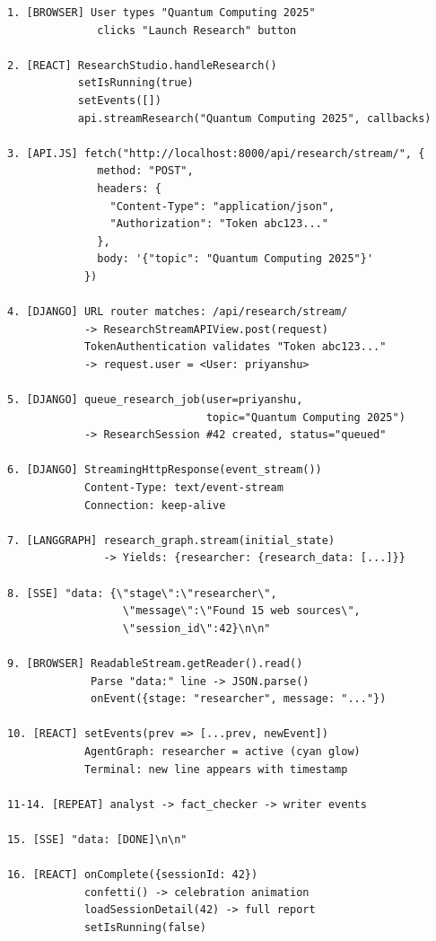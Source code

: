 \documentclass[11pt,a4paper,twoside]{report}
\begin{document}
\begin{lstlisting}[language={},caption={Complete Request Trace}]
1. [BROWSER] User types "Quantum Computing 2025"
              clicks "Launch Research" button

2. [REACT] ResearchStudio.handleResearch()
           setIsRunning(true)
           setEvents([])
           api.streamResearch("Quantum Computing 2025", callbacks)

3. [API.JS] fetch("http://localhost:8000/api/research/stream/", {
              method: "POST",
              headers: {
                "Content-Type": "application/json",
                "Authorization": "Token abc123..."
              },
              body: '{"topic": "Quantum Computing 2025"}'
            })

4. [DJANGO] URL router matches: /api/research/stream/
            -> ResearchStreamAPIView.post(request)
            TokenAuthentication validates "Token abc123..."
            -> request.user = <User: priyanshu>

5. [DJANGO] queue_research_job(user=priyanshu,
                               topic="Quantum Computing 2025")
            -> ResearchSession #42 created, status="queued"

6. [DJANGO] StreamingHttpResponse(event_stream())
            Content-Type: text/event-stream
            Connection: keep-alive

7. [LANGGRAPH] research_graph.stream(initial_state)
               -> Yields: {researcher: {research_data: [...]}}

8. [SSE] "data: {\"stage\":\"researcher\",
                  \"message\":\"Found 15 web sources\",
                  \"session_id\":42}\n\n"

9. [BROWSER] ReadableStream.getReader().read()
             Parse "data:" line -> JSON.parse()
             onEvent({stage: "researcher", message: "..."})

10. [REACT] setEvents(prev => [...prev, newEvent])
            AgentGraph: researcher = active (cyan glow)
            Terminal: new line appears with timestamp

11-14. [REPEAT] analyst -> fact_checker -> writer events

15. [SSE] "data: [DONE]\n\n"

16. [REACT] onComplete({sessionId: 42})
            confetti() -> celebration animation
            loadSessionDetail(42) -> full report
            setIsRunning(false)
\end{lstlisting}
\end{document}
